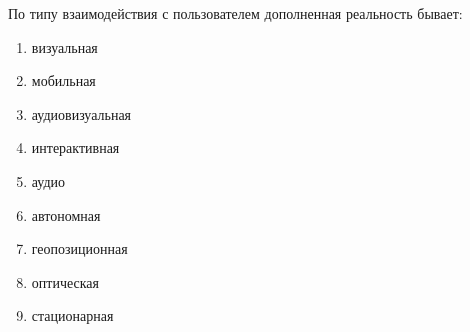 
По типу взаимодействия с пользователем дополненная реальность бывает:

\begin{enumerate}
    \item визуальная
    \item мобильная
    \item аудиовизуальная
    \item интерактивная
    \item аудио
    \item автономная
    \item геопозиционная
    \item оптическая
    \item стационарная
\end{enumerate}
